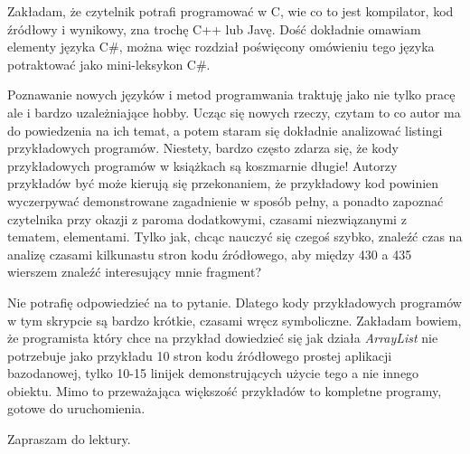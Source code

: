 Zakładam, że czytelnik potrafi programować w C, wie co to jest kompilator, kod źródłowy i wynikowy, zna
trochę C++ lub Javę. Dość dokładnie omawiam elementy języka C\#, można więc rozdział poświęcony omówieniu
tego języka potraktować jako mini-leksykon C\#.

Poznawanie nowych języków i metod programwania traktuję jako nie tylko pracę ale i bardzo uzależniające
hobby. Ucząc się nowych rzeczy, czytam to co autor ma do powiedzenia na ich temat, a potem
staram się dokładnie analizować listingi przykładowych programów. Niestety, bardzo często zdarza się, że
kody przykładowych programów w książkach są koszmarnie długie! Autorzy przykładów być może kierują się
przekonaniem, że przykładowy kod powinien wyczerpywać demonstrowane zagadnienie w sposób pełny, a
ponadto zapoznać czytelnika przy okazji z paroma dodatkowymi, czasami niezwiązanymi z tematem, elementami. Tylko
jak, chcąc nauczyć się czegoś szybko, znaleźć czas na analizę czasami kilkunastu stron kodu źródłowego,
aby między 430 a 435 wierszem znaleźć interesujący mnie fragment?

Nie potrafię odpowiedzieć na to pytanie. Dlatego kody przykładowych programów w tym skrypcie są bardzo
krótkie, czasami wręcz symboliczne. Zakładam bowiem, że programista który chce na przykład dowiedzieć się
jak działa {\em ArrayList} nie potrzebuje jako przykładu 10 stron kodu źródłowego prostej aplikacji bazodanowej,
tylko 10-15 linijek demonstrujących użycie tego a nie innego obiektu. Mimo to przeważająca większość 
przykładów to kompletne programy, gotowe do uruchomienia.

Zapraszam do lektury.
